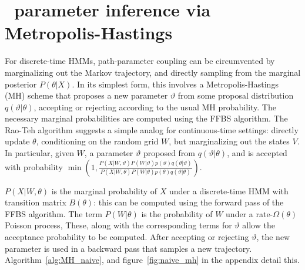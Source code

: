 \section{\Naive\ parameter inference via Metropolis-Hastings}
For discrete-time HMMs, path-parameter coupling can be circumvented by marginalizing out the Markov trajectory, and directly sampling from the marginal posterior $P(\theta|X)$.
In its simplest form, this involves a Metropolis-Hastings (MH) scheme that proposes a new parameter $\vartheta$ from some proposal distribution $q(\vartheta|\theta)$, accepting or rejecting according to the usual MH probability.
The necessary marginal probabilities are computed using the FFBS algorithm.
The Rao-Teh algorithm suggests a simple analog for continuous-time settings: directly update $\theta$, conditioning on the random grid $W$, but marginalizing out the states $V$.
In particular, given $W$, a parameter $\vartheta$ proposed from $q(\vartheta|\theta)$, and is accepted with probability 
$\min\left(1, 
\frac{P(X|W,\vartheta) P(W|\vartheta)p(\vartheta)q(\theta|\vartheta)} {P(X|W,\theta) P(W|\theta)p(\theta)q(\vartheta|\theta)}\right)$. 

$P(X|W,\theta)$ is the marginal probability of $X$ under a discrete-time HMM with transition matrix $B(\theta)$: this can be computed using the forward pass of the FFBS algorithm. 
The term $P(W|\theta)$ is the probability of $W$ under a rate-$\Omega(\theta)$ Poisson process, 
These, along with the corresponding terms for $\vartheta$ allow the acceptance probability to be computed.
After accepting or rejecting $\vartheta$, the new parameter is used in
a backward pass that samples a new trajectory. 
Algorithm~\ref{alg:MH_naive}, and figure~\ref{fig:naive_mh} in the appendix detail this.

